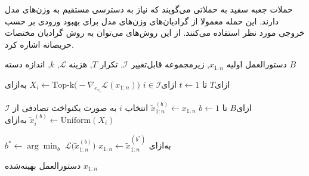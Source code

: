 حملات جعبه سفید به حملاتی می‌گویند که نیاز به دسترسی مستقیم به وزن‌های مدل دارند. این حمله معمولا از گرادیان‌های وزن‌های مدل برای بهبود ورودی بر حسب خروجی مورد نظر استفاده می‌کنند. از این روش‌های می‌توان به روش گرادیان مختصات حریصانه اشاره کرد.

 دستورالعمل اولیه $x_{1:n}$, زیرمجموعه قابل‌تغییر $\mathcal{I}$, 
  تکرار $T$, هزینه $\mathcal{L}$, $k$, اندازه دسته $B$

‌ازای{$t \gets 1 \text{ تا } T$}
  ‌ازای{$i \in \mathcal{I}$}
     $X_i \gets \mathrm{Top\text{-}k}\bigl(-\nabla_{e_{x_i}}\mathcal{L}(x_{1:n})\bigr)$ 
  ‌به‌ازای

  ‌ازای{$b \gets 1 \text{ تا } B$}
     $\tilde{x}^{(b)}_{1:n} \gets x_{1:n}$ 
     انتخاب $i$ به صورت یکنواخت تصادفی از $\mathcal{I}$
     $\tilde{x}^{(b)}_i \gets \mathrm{Uniform}(X_i)$ 
  ‌به‌ازای

   $b^* \gets \arg \min_{b}\; \mathcal{L}\bigl(\tilde{x}^{(b)}_{1:n}\bigr)$
   $x_{1:n} \gets \tilde{x}^{(b^*)}_{1:n}$ 
‌به‌ازای

  دستورالعمل بهینه‌شده $x_{1:n}$
